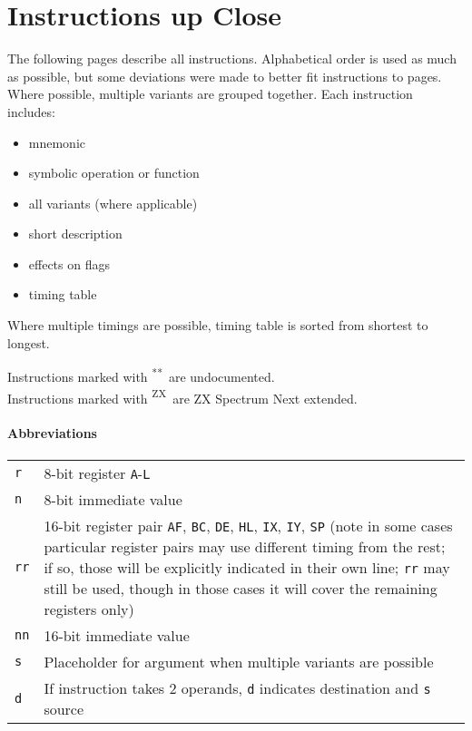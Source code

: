 \documentclass[twoside,openright,a4paper]{book}
\newcommand{\UNDOC}{\textnormal{\textsuperscript{**}}}
\newcommand{\ZXN}{\textnormal{\textsuperscript{ZX}}}
\begin{document}
\chapter{Instructions up Close}
\label{instruction_details}

The following pages describe all instructions. Alphabetical order is used as much as possible, but some deviations were made to better fit instructions to pages. Where possible, multiple variants are grouped together. Each instruction includes:

\begin{itemize}
	\item mnemonic
	\item symbolic operation or function
	\item all variants (where applicable)
	\item short description
	\item effects on flags
	\item timing table
\end{itemize}

Where multiple timings are possible, timing table is sorted from shortest to longest.

Instructions marked with \UNDOC ~are undocumented.\\
Instructions marked with \ZXN ~are ZX Spectrum Next extended.

\subsubsection{Abbreviations}

\begin{tabularx}{\textwidth}{lX}
	{\tt r} & 
		8-bit register {\tt A}-{\tt L}\\
	{\tt n} &
		8-bit immediate value\\
	{\tt rr} & 
		16-bit register pair {\tt AF}, {\tt BC}, {\tt DE}, {\tt HL}, {\tt IX}, {\tt IY}, {\tt SP} (note in some cases particular register pairs may use different timing from the rest; if so, those will be explicitly indicated in their own line; {\tt rr} may still be used, though in those cases it will cover the remaining registers only) \\
	{\tt nn} & 
		16-bit immediate value \\
	{\tt s} &
		Placeholder for argument when multiple variants are possible \\
	{\tt d} &
		If instruction takes 2 operands, {\tt d} indicates destination and {\tt s} source \\
\end{tabularx}
\end{document}
